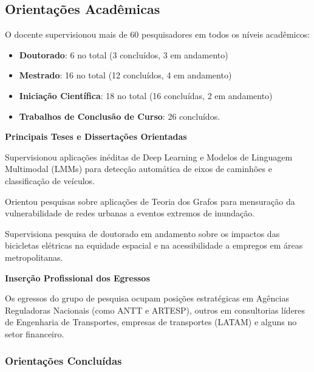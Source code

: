\documentclass[
  brazilian,
  11pt,
  a4paper,
]{article}
\providecommand{\tightlist}{%
  \setlength{\itemsep}{0pt}\setlength{\parskip}{0pt}}
\begin{document}
\subsection{Orientações
Acadêmicas}\label{orientauxe7uxf5es-acaduxeamicas}

O docente supervisionou mais de 60 pesquisadores em todos os níveis
acadêmicos:

\begin{itemize}
\tightlist
\item
  \textbf{Doutorado}: 6 no total (3 concluídos, 3 em andamento)
\item
  \textbf{Mestrado}: 16 no total (12 concluídos, 4 em andamento)
\item
  \textbf{Iniciação Científica}: 18 no total (16 concluídas, 2 em
  andamento)
\item
  \textbf{Trabalhos de Conclusão de Curso}: 26 concluídos.
\end{itemize}

\textbf{Principais Teses e Dissertações Orientadas}

\begin{description}
\tightlist
\item[IA e Visão Computacional]
Supervisionou aplicações inéditas de Deep Learning e Modelos de
Linguagem Multimodal (LMMs) para detecção automática de eixos de
caminhões e classificação de veículos.
\item[Resiliência de Infraestrutura]
Orientou pesquisas sobre aplicações de Teoria dos Grafos para mensuração
da vulnerabilidade de redes urbanas a eventos extremos de inundação.
\item[Mobilidade Sustentável]
Supervisiona pesquisa de doutorado em andamento sobre os impactos das
bicicletas elétricas na equidade espacial e na acessibilidade a empregos
em áreas metropolitanas.
\end{description}

\textbf{Inserção Profissional dos Egressos}

Os egressos do grupo de pesquisa ocupam posições estratégicas em
Agências Reguladoras Nacionais (como ANTT e ARTESP), outros em
consultorias líderes de Engenharia de Transportes, empresas de
transportes (LATAM) e alguns no setor financeiro.

\subsubsection{Orientações
Concluídas}\label{orientauxe7uxf5es-concluuxeddas}
\end{document}
